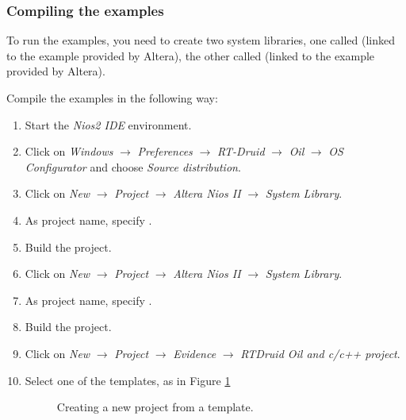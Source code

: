 \subsubsection{Compiling the examples}
To run the examples, you need to create two
system libraries, one called  (linked to the
 example provided by Altera), the other called
 (linked to the 
example provided by Altera). 

Compile the examples in the following way:
\begin{enumerate}
\item Start the {\em Nios2 IDE} environment.
\item Click on {\em Windows} $\to$ {\em Preferences} $\to$ {\em RT-Druid} $\to$
{\em Oil} $\to$ {\em OS Configurator} and choose {\em Source distribution}.
\item Click on {\em New} $\to$ {\em Project} $\to$ {\em Altera Nios II} $\to$ {\em System Library}.
\item As project name, specify .
\item Build the project.

\item Click on {\em New} $\to$ {\em Project} $\to$ {\em Altera Nios II} $\to$ {\em System Library}.
\item As project name, specify .
\item Build the project.
\item Click on {\em New} $\to$ {\em Project} $\to$ {\em Evidence} $\to$ {\em RTDruid Oil and c/c++ project}.
\item Select one of the templates, as in Figure \ref{fig:newproject_nios2}

%
\begin{figure}
\caption{\label{fig:newproject_nios2} Creating a new project from a template.}
\end{figure}
%



\end{enumerate}
